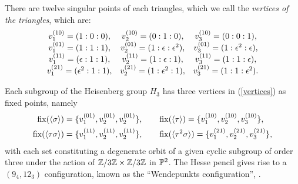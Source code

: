 There are twelve singular points of each triangles, which we call the \emph{vertices of the triangles}, which are:
\begin{eqnarray}
\label{vertices}
\begin{array}{ccc}
v^{(10)}_1=(1:0:0),        & v^{(10)}_2=(0:1:0),        & v^{(10)}_3=(0:0:1),\\
v^{(01)}_1=(1:1:1),   & v^{(01)}_2=(1:\epsilon:\epsilon^2), & v^{(01)}_3=(1:\epsilon^{2}:\epsilon),\\
v^{(11)}_1=(\epsilon:1:1), & v^{(11)}_2=(1:\epsilon:1),   & v^{(11)}_3=(1:1:\epsilon),\\
v^{(21)}_1 = (\epsilon^{2}:1:1), & v^{(21)}_{2} = (1:\epsilon^{2}: 1), & v^{(21)}_{3} = (1:1:\epsilon^{2}).
\end{array}
\end{eqnarray}

Each subgroup of the Heisenberg group $H_{3}$ has three vertices in (\ref{vertices}) as fixed points, namely
\begin{equation*}
	\begin{split}
	\operatorname{fix}(\langle \sigma \rangle) = \{ v^{(01)}_{1}, v^{(01)}_{2}, v^{(01)}_{2}\},\qquad
	&\operatorname{fix}(\langle \tau \rangle) = \{ v^{(10)}_{1}, v^{(10)}_{2}, v^{(10)}_{3}\},\\
	\operatorname{fix}(\langle \tau\sigma \rangle) = \{ v^{(11)}_{1}, v^{(11)}_{2}, v^{(11)}_{2}\},\qquad
	&\operatorname{fix}(\langle \tau^{2}\sigma \rangle) = \{ v^{(21)}_{1}, v^{(21)}_{2}, v^{(21)}_{3}\},\\
	\end{split}
\end{equation*}
with each set constituting a degenerate orbit of a given cyclic subgroup of order three under the action of $\mathbb{Z}/3\mathbb{Z} \times \mathbb{Z}/3\mathbb{Z}$ in $\mathbb{P}^{2}$. The Hesse pencil gives rise to a $(9_{4}, 12_{3})$ configuration, known as the ``Wendepunkts configuration'', \cite{Hulek_1983}.


